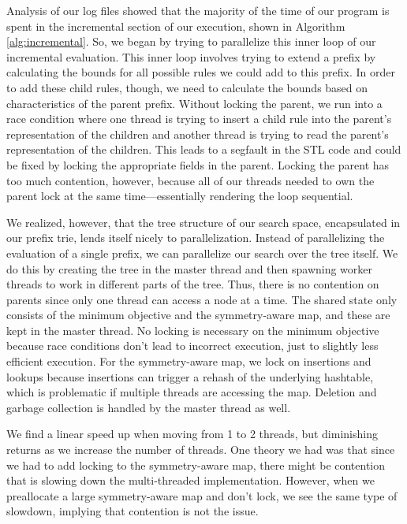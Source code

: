 Analysis of our log files showed that the majority of the time of our program is spent in the incremental section of our execution, shown in Algorithm \ref{alg:incremental}.
So, we began by trying to parallelize this inner loop of our incremental evaluation.
This inner loop involves trying to extend a prefix by calculating the bounds for all possible rules we could add to this prefix.
In order to add these child rules, though, we need to calculate the bounds based on characteristics of the parent prefix.
Without locking the parent, we run into a race condition where one thread is trying to insert a child rule into the parent's representation of the children and another thread is trying to read the parent's representation of the children.
This leads to a segfault in the STL code and could be fixed by locking the appropriate fields in the parent.
Locking the parent has too much contention, however, because all of our threads needed to own the parent lock at the same time---essentially rendering the loop sequential.

We realized, however, that the tree structure of our search space, encapsulated in our prefix trie, lends itself nicely to parallelization.
Instead of parallelizing the evaluation of a single prefix, we can parallelize our search over the tree itself.
We do this by creating the tree in the master thread and then spawning worker threads to work in different parts of the tree.
Thus, there is no contention on parents since only one thread can access a node at a time.
The shared state only consists of the minimum objective and the symmetry-aware map, and these are kept in the master thread.
No locking is necessary on the minimum objective because race conditions don't lead to incorrect execution, just to slightly less efficient execution.
For the symmetry-aware map, we lock on insertions and lookups because insertions can trigger a rehash of the underlying hashtable, which is problematic if multiple threads are accessing the map. 
Deletion and garbage collection is handled by the master thread as well.

We find a linear speed up when moving from 1 to 2 threads, but diminishing returns as we increase the number of threads.
One theory we had was that since we had to add locking to the symmetry-aware map, there might be contention that is slowing down the multi-threaded implementation.
However, when we preallocate a large symmetry-aware map and don't lock, we see the same type of slowdown, implying that contention is not the issue.
